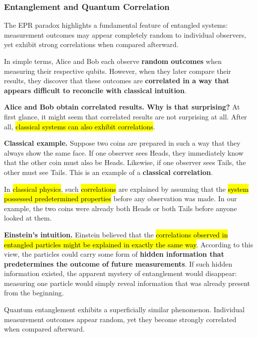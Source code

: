 \subsubsection{Entanglement and Quantum Correlation}\label{sec:entanglement-and-quantum-correlation}

The EPR paradox highlights a fundamental feature of entangled systems: measurement outcomes may appear completely random to individual observers, yet exhibit strong correlations when compared afterward.

\highspace
In simple terms, Alice and Bob each observe \textbf{random outcomes} when measuring their respective qubits. However, when they later compare their results, they discover that these outcomes are \textbf{correlated in a way that appears difficult to reconcile with classical intuition}.

\highspace
\textcolor{Green3}{ \textbf{Alice and Bob obtain correlated results. Why is that surprising?}} At first glance, it might seem that correlated results are not surprising at all. After all, \hl{classical systems can also exhibit correlations}.

\highspace
\textcolor{Green3}{ \textbf{Classical example.}}
Suppose two coins are prepared in such a way that they always show the same face. If one observer sees Heads, they immediately know that the other coin must also be Heads. Likewise, if one observer sees Tails, the other must see Tails. This is an example of a \textbf{classical correlation}.

\highspace
In \hl{classical physics}, such \hl{correlations} are explained by assuming that the \hl{system possessed predetermined properties} before any observation was made. In our example, the two coins were already both Heads or both Tails before anyone looked at them.

\highspace
\textcolor{Green3}{ \textbf{Einstein's intuition.}} Einstein believed that the \hl{correlations observed in entangled particles might be explained in exactly the same way}. According to this view, the particles could carry some form of \textbf{hidden information that predetermines the outcome of future measurements}. If such hidden information existed, the apparent mystery of entanglement would disappear: measuring one particle would simply reveal information that was already present from the beginning.

\highspace
Quantum entanglement exhibits a superficially similar phenomenon. Individual measurement outcomes appear random, yet they become strongly correlated when compared afterward.

